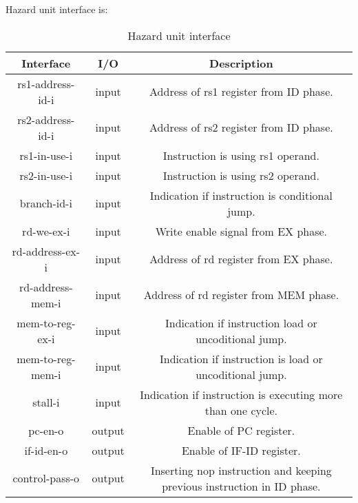 \documentclass{scrreprt}
\begin{document}
    Hazard unit interface is:
    \begin{table}[htb!]
            \centering
            \begin{tabular}{|c|c|c|} \hline 
             Interface & I/O & Description \\ \hline  
             rs1-address-id-i & input & Address of rs1 register from ID phase. \\ \hline  
             rs2-address-id-i & input & Address of rs2 register from ID phase.  \\ \hline
             rs1-in-use-i & input & Instruction is using rs1 operand. \\ \hline
             rs2-in-use-i & input & Instruction is using rs2 operand. \\ \hline
             branch-id-i  & input & Indication if instruction is conditional jump. \\ \hline
             rd-we-ex-i & input & Write enable signal from EX phase. \\ \hline
             rd-address-ex-i & input & Address of rd register from EX phase. \\ \hline
             rd-address-mem-i & input & Address of rd register from MEM phase. \\ \hline
             mem-to-reg-ex-i & input & Indication if instruction load or uncoditional jump. \\ \hline
             mem-to-reg-mem-i & input & Indication if instruction is load or uncoditional jump. \\ \hline
             stall-i & input & Indication if instruction is executing more than one cycle. \\ \hline
             pc-en-o & output & Enable of PC register. \\ \hline
             if-id-en-o & output & Enable of IF-ID register. \\ \hline
             control-pass-o & output & Inserting nop instruction and keeping previous instruction in ID phase. \\ \hline
        \end{tabular}
        \caption{Hazard unit interface}
        \label{tab:Hazard}
    \end{table}
\end{document}

